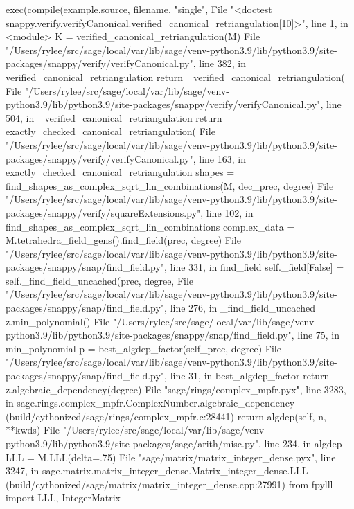         exec(compile(example.source, filename, "single",
      File "<doctest snappy.verify.verifyCanonical.verified_canonical_retriangulation[10]>", line 1, in <module>
        K = verified_canonical_retriangulation(M)
      File "/Users/rylee/src/sage/local/var/lib/sage/venv-python3.9/lib/python3.9/site-packages/snappy/verify/verifyCanonical.py", line 382, in verified_canonical_retriangulation
        return _verified_canonical_retriangulation(
      File "/Users/rylee/src/sage/local/var/lib/sage/venv-python3.9/lib/python3.9/site-packages/snappy/verify/verifyCanonical.py", line 504, in _verified_canonical_retriangulation
        return exactly_checked_canonical_retriangulation(
      File "/Users/rylee/src/sage/local/var/lib/sage/venv-python3.9/lib/python3.9/site-packages/snappy/verify/verifyCanonical.py", line 163, in exactly_checked_canonical_retriangulation
        shapes = find_shapes_as_complex_sqrt_lin_combinations(M, dec_prec, degree)
      File "/Users/rylee/src/sage/local/var/lib/sage/venv-python3.9/lib/python3.9/site-packages/snappy/verify/squareExtensions.py", line 102, in find_shapes_as_complex_sqrt_lin_combinations
        complex_data = M.tetrahedra_field_gens().find_field(prec, degree)
      File "/Users/rylee/src/sage/local/var/lib/sage/venv-python3.9/lib/python3.9/site-packages/snappy/snap/find_field.py", line 331, in find_field
        self._field[False] = self._find_field_uncached(prec, degree,
      File "/Users/rylee/src/sage/local/var/lib/sage/venv-python3.9/lib/python3.9/site-packages/snappy/snap/find_field.py", line 276, in _find_field_uncached
        z.min_polynomial()
      File "/Users/rylee/src/sage/local/var/lib/sage/venv-python3.9/lib/python3.9/site-packages/snappy/snap/find_field.py", line 75, in min_polynomial
        p = best_algdep_factor(self_prec, degree)
      File "/Users/rylee/src/sage/local/var/lib/sage/venv-python3.9/lib/python3.9/site-packages/snappy/snap/find_field.py", line 31, in best_algdep_factor
        return z.algebraic_dependency(degree)
      File "sage/rings/complex_mpfr.pyx", line 3283, in sage.rings.complex_mpfr.ComplexNumber.algebraic_dependency (build/cythonized/sage/rings/complex_mpfr.c:28441)
        return algdep(self, n, **kwds)
      File "/Users/rylee/src/sage/local/var/lib/sage/venv-python3.9/lib/python3.9/site-packages/sage/arith/misc.py", line 234, in algdep
        LLL = M.LLL(delta=.75)
      File "sage/matrix/matrix_integer_dense.pyx", line 3247, in sage.matrix.matrix_integer_dense.Matrix_integer_dense.LLL (build/cythonized/sage/matrix/matrix_integer_dense.cpp:27991)
        from fpylll import LLL, IntegerMatrix
